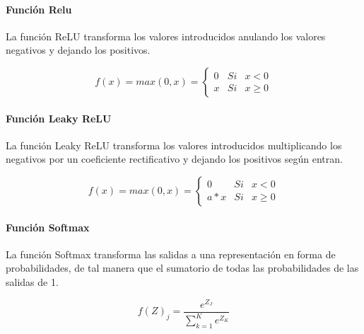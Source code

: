 \documentclass[
  12pt,
]{article}
\begin{document}
\hypertarget{funciuxf3n-relu}{%
\paragraph{Función Relu}\label{funciuxf3n-relu}}

La función ReLU transforma los valores introducidos anulando los valores
negativos y dejando los positivos.

\[ f(x) = max(0,x) = \left \{
\begin{array}{rcl}
     0 & Si & x < 0
  \\ x & Si & x \geq{0}
\end{array}
\right. \]

\hypertarget{funciuxf3n-leaky-relu}{%
\paragraph{Función Leaky ReLU}\label{funciuxf3n-leaky-relu}}

La función Leaky ReLU transforma los valores introducidos multiplicando
los negativos por un coeficiente rectificativo y dejando los positivos
según entran.

\[ f(x) = max(0,x) = \left \{
\begin{array}{rcl}
     0 & Si & x < 0
  \\ a*x & Si & x \geq{0}
\end{array}
\right. \]

\hypertarget{funciuxf3n-softmax}{%
\paragraph{Función Softmax}\label{funciuxf3n-softmax}}

La función Softmax transforma las salidas a una representación en forma
de probabilidades, de tal manera que el sumatorio de todas las
probabilidades de las salidas de 1.

\[ f(Z)_{j} = \frac{ e^{Z_{J}} }{ \sum_{k=1}^{K} e^{Z_{K}} } \]
\end{document}
